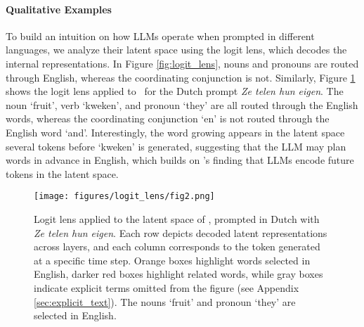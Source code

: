 \paragraph{Qualitative Examples}
To build an intuition on how LLMs operate when prompted in different languages, we analyze their latent space using the logit lens, which decodes the internal representations. 
In Figure \ref{fig:logit_lens}, nouns and pronouns are routed through English, whereas the coordinating conjunction is not. 
Similarly, Figure \ref{fig:logit_lens_nl} shows the logit lens applied to \llama \ for the Dutch prompt \textit{Ze telen hun eigen}. 
The noun `fruit', verb `kweken', and pronoun `they' are all routed through the English words, whereas the coordinating conjunction `en' is not routed through the English word `and'. 
Interestingly, the word growing appears in the latent space several tokens before `kweken' is generated, suggesting that the LLM may plan words in advance in English, which builds on \citet{Pal_2023}'s finding that LLMs encode future tokens in the latent space.

\begin{figure}
    \begin{minipage}{0.5\textwidth}
    \texttt{[image: figures/logit\_lens/fig2.png]} 
    \end{minipage}
     \caption{Logit lens applied to the latent space of \llama, prompted in Dutch with \textit{Ze telen hun eigen}. Each row depicts decoded latent representations across layers, and each column corresponds to the token generated at a specific time step. Orange boxes highlight words selected in English, darker red boxes highlight related words, while gray boxes indicate explicit terms omitted from the figure (see Appendix \ref{sec:explicit_text}). The nouns `fruit' and pronoun `they' are selected in English.}
    \label{fig:logit_lens_nl}
\end{figure}

